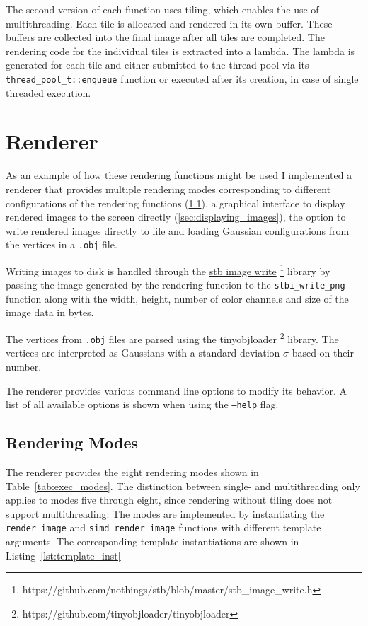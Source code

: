 \documentclass[a4paper, 11pt]{memoir}
\begin{document}
    The second version of each function uses tiling, which enables the use of multithreading. Each tile is allocated and
    rendered in its own buffer. These buffers are collected into the final image after all tiles are completed. The
    rendering code for the individual tiles is extracted into a lambda. The lambda is generated for each tile and either
    submitted to the thread pool via its \texttt{thread_pool_t::enqueue} function or executed after its creation,
    in case of single threaded execution.

    \section{Renderer}
    \label{sec:renderer}
    As an example of how these rendering functions might be used I implemented a renderer that provides multiple rendering
    modes corresponding to different configurations of the rendering functions (\ref{sec:rendering_modes}), a graphical
    interface to display rendered images to the screen directly (\ref{sec:displaying_images}), the option to write
    rendered images directly to file and loading Gaussian configurations from the vertices in a \texttt{.obj}
    file.

    Writing images to disk is handled through the \href{https://github.com/nothings/stb/blob/master/stb_image_write.h}{stb image write}
    \footnote{https://github.com/nothings/stb/blob/master/stb\_image\_write.h} library by passing the image generated by
    the rendering function to the \texttt{stbi_write_png} function along with the width, height, number of color
    channels and size of the image data in bytes.

    The vertices from \texttt{.obj} files are parsed using the \href{https://github.com/tinyobjloader/tinyobjloader}{tinyobjloader}
    \footnote{https://github.com/tinyobjloader/tinyobjloader} library. The vertices are interpreted as Gaussians with a
    standard deviation $\sigma$ based on their number.

    The renderer provides various command line options to modify its behavior. A list of all available options is shown
    when using the \texttt{--help} flag.

    \subsection{Rendering Modes}
    \label{sec:rendering_modes}
    The renderer provides the eight rendering modes shown in Table~\ref{tab:exec_modes}. The distinction between single-
    and multithreading only applies to modes five through eight, since rendering without tiling does not support
    multithreading.
    The modes are implemented by instantiating the \texttt{render_image} and \texttt{simd_render_image}
    functions with different template arguments. The corresponding template instantiations are shown in Listing~\ref{lst:template_inst}
\end{document}
